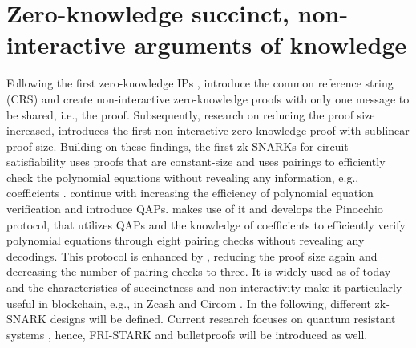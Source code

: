 \section{Zero-knowledge succinct, non-interactive arguments of knowledge}
Following the first zero-knowledge IPs \citep{GoldwasserIPs}, \citet{Blum1991} introduce the common reference string (CRS) and create non-interactive zero-knowledge proofs with only one message to be shared, i.e., the proof. Subsequently, research on reducing the proof size increased, \citet{Micali} introduces the first non-interactive zero-knowledge proof with sublinear proof size. Building on these findings, the first zk-SNARKs for circuit satisfiability uses proofs that are constant-size and uses pairings to efficiently check the polynomial equations without revealing any information, e.g., coefficients \citep{Groth2010ShortPN}. \citet{GennaroLinPCP} continue with increasing the efficiency of polynomial equation verification and introduce QAPs. \citet{Pinocchio} makes use of it and develops the Pinocchio protocol, that utilizes QAPs and the knowledge of coefficients to efficiently verify polynomial equations through eight pairing checks without revealing any decodings. This protocol is enhanced by \citet{Groth2016OnTS}, reducing the proof size again and decreasing the number of pairing checks to three. It is widely used as of today and the characteristics of succinctness and non-interactivity make it particularly useful in blockchain, e.g., in Zcash and Circom \citep{chen2022review}. In the following, different zk-SNARK designs will be defined. Current research focuses on quantum resistant systems \citep{chen2022review}, hence, FRI-STARK and bulletproofs will be introduced as well. 

